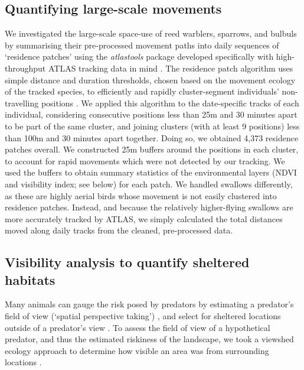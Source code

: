 \begin{refsection}
\subsection*{Quantifying large-scale movements}

We investigated the large-scale space-use of reed warblers, sparrows, and bulbuls by summarising their pre-processed movement paths into daily sequences of `residence patches' using the \textit{atlastools} package developed specifically with high-throughput ATLAS tracking data in mind \citep{gupte2022d}.
The residence patch algorithm uses simple distance and duration thresholds, chosen based on the movement ecology of the tracked species, to efficiently and rapidly cluster-segment individuals' non-travelling positions \citep{gupte2022d}.
We applied this algorithm to the date-specific tracks of each individual, considering consecutive positions less than 25m and 30 minutes apart to be part of the same cluster, and joining clusters (with at least 9 positions) less than 100m and 30 minutes apart together.
Doing so, we obtained 4,373 residence patches overall.
We constructed 25m buffers around the positions in each cluster, to account for rapid movements which were not detected by our tracking.
We used the buffers to obtain summary statistics of the environmental layers (NDVI and visibility index; see below) for each patch.
We handled swallows differently, as these are highly aerial birds whose movement is not easily clustered into residence patches.
Instead, and because the relatively higher-flying swallows are more accurately tracked by ATLAS, we simply calculated the total distances moved along daily tracks from the cleaned, pre-processed data.

\subsection*{Visibility analysis to quantify sheltered habitats}

Many animals can gauge the risk posed by predators by estimating a predator's field of view (`spatial perspective taking') \cite{emery2000,bruce2003,davidson2016}, and select for sheltered locations outside of a predator's view \citep{hampton1994,krams2001,watve2002}.
To assess the field of view of a hypothetical predator, and thus the estimated riskiness of the landscape, we took a viewshed ecology approach to determine how visible an area was from surrounding locations \citep{aben2018,aben2021}.


\end{refsection}
